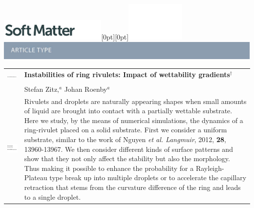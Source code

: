 \documentclass[twoside,twocolumn,9pt]{article}
\begin{document}
  \begin{@twocolumnfalse}
{\includegraphics[height=30pt]{head_foot/SM}\hfill\raisebox{0pt}[0pt][0pt]{\includegraphics[height=55pt]{head_foot/RSC_LOGO_CMYK}}\\[1ex]
\includegraphics[width=18.5cm]{head_foot/header_bar}}\par
\vspace{1em}
\sffamily
\begin{tabular}{m{4.5cm} p{13.5cm} }

\includegraphics{head_foot/DOI} & \noindent\LARGE{\textbf{Instabilities of ring rivulets: Impact of wettability gradients$^\dag$}} \\%
\vspace{0.3cm} & \vspace{0.3cm} \\

 & \noindent\large{Stefan Zitz,\textit{$^{a}$} Johan Roenby\textit{$^{a}$}} \\%

\includegraphics{head_foot/dates} & \noindent\normalsize{
Rivulets and droplets are naturally appearing shapes when small amounts of liquid are brought into contact with a partially wettable substrate.
Here we study, by the means of numerical simulations, the dynamics of a ring-rivulet placed on a solid substrate.
First we consider a uniform substrate, similar to the work of Nguyen \textit{et al. Langmuir}, 2012, \textbf{28}, 13960-13967.
We then consider different kinds of surface patterns and show that they not only affect the stability but also the morphology.
Thus making it possible to enhance the probability for a Rayleigh-Plateau type break up into multiple droplets or to accelerate the capillary retraction that stems from the curvature difference of the ring and leads to a single droplet.
}

\end{tabular}

 \end{@twocolumnfalse} \vspace{0.6cm}
\end{document}

